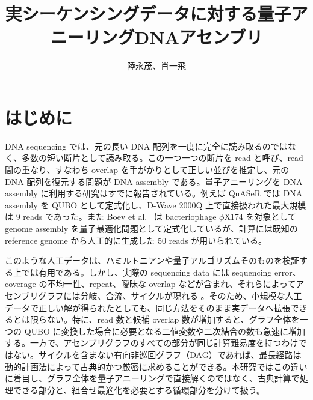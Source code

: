 \documentclass[a4j,10pt]{ujarticle}
\begin{document}

\title{
実シーケンシングデータに対する量子アニーリングDNAアセンブリ\\
}

\author{陸永茂、肖一飛}
\date{}

\maketitle

\vspace{5mm}


\renewcommand{\contentsname}{目次}
\setcounter{tocdepth}{2}
\tableofcontents

\newpage
\section{はじめに}

DNA sequencing では、元の長い DNA 配列を一度に完全に読み取るのではなく、多数の短い断片として読み取る。この一つ一つの断片を read と呼び、read 間の重なり、すなわち overlap を手がかりとして正しい並びを推定し、元の DNA 配列を復元する問題が DNA assembly である。量子アニーリングを DNA assembly に利用する研究はすでに報告されている。例えば QuASeR \cite{sarkar2021quaser} では DNA assembly を QUBO として定式化し、D-Wave 2000Q 上で直接扱われた最大規模は 9 reads であった。また Boev et al.\ \cite{boev2021genome} は bacteriophage $\phi$X174 を対象として genome assembly を量子最適化問題として定式化しているが、計算には既知の reference genome から人工的に生成した 50 reads が用いられている。

このような人工データは、ハミルトニアンや量子アルゴリズムそのものを検証する上では有用である。しかし、実際の sequencing data には sequencing error、coverage の不均一性、repeat、曖昧な overlap などが含まれ、それらによってアセンブリグラフには分岐、合流、サイクルが現れる \cite{li2016miniasm,kamath2017hinge,kolmogorov2019flye}。そのため、小規模な人工データで正しい解が得られたとしても、同じ方法をそのまま実データへ拡張できるとは限らない。特に、read 数と候補 overlap 数が増加すると、グラフ全体を一つの QUBO に変換した場合に必要となる二値変数や二次結合の数も急速に増加する。一方で、アセンブリグラフのすべての部分が同じ計算難易度を持つわけではない。サイクルを含まない有向非巡回グラフ（DAG）であれば、最長経路は動的計画法によって古典的かつ厳密に求めることができる。本研究ではこの違いに着目し、グラフ全体を量子アニーリングで直接解くのではなく、古典計算で処理できる部分と、組合せ最適化を必要とする循環部分を分けて扱う。
\end{document}
